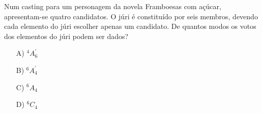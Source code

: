 Num casting para um personagem da novela Framboesas com açúcar, apresentam-se quatro candidatos. O júri é constituído por seis membros, devendo cada elemento do júri escolher apenas um candidato. De quantos modos os votos dos elementos do júri podem ser dados?
\begin{enumerate}
\item [A)] $^4A^{\prime}_6$
\item [B)] $^6A^{\prime}_4$
\item [C)] $^6A_4$
\item [D)] $^6C_4$
\end{enumerate}
